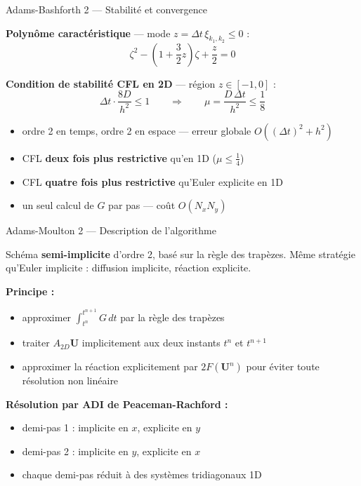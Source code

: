 \documentclass[10pt]{beamer}
\begin{document}
\begin{frame}{Adams-Bashforth 2 — Stabilité et convergence}

\textbf{Polynôme caractéristique} — mode $z = \Delta t\,\xi_{k_1,k_2} \leq 0$ :
\begin{equation}
  \zeta^2 - \left(1 + \frac{3}{2}z\right)\zeta + \frac{z}{2} = 0
\end{equation}

\bigskip

\textbf{Condition de stabilité CFL en 2D} — région $z \in [-1, 0]$ :
\begin{equation}
  \Delta t \cdot \frac{8D}{h^2} \leq 1
  \qquad \Longrightarrow \qquad
  \boxed{\mu = \frac{D\,\Delta t}{h^2} \leq \frac{1}{8}}
\end{equation}

\bigskip

\begin{itemize}
  \item ordre 2 en temps, ordre 2 en espace — erreur globale $O((\Delta t)^2 + h^2)$
  \item CFL \textbf{deux fois plus restrictive} qu'en 1D ($\mu \leq \tfrac{1}{4}$)
  \item CFL \textbf{quatre fois plus restrictive} qu'Euler explicite en 1D
  \item un seul calcul de $G$ par pas — coût $O(N_x N_y)$
\end{itemize}

\end{frame}

\begin{frame}{Adams-Moulton 2 — Description de l'algorithme}

Schéma \textbf{semi-implicite} d'ordre 2, basé sur la règle des trapèzes.
Même stratégie qu'Euler implicite : diffusion implicite, réaction explicite.

\bigskip

\textbf{Principe :}
\begin{itemize}
  \item approximer $\int_{t^n}^{t^{n+1}} G\,dt$ par la règle des trapèzes
  \item traiter $A_{2D}\mathbf{U}$ implicitement aux deux instants $t^n$ et $t^{n+1}$
  \item approximer la réaction explicitement par $2F(\mathbf{U}^n)$
        pour éviter toute résolution non linéaire
\end{itemize}

\bigskip

\textbf{Résolution par ADI de Peaceman-Rachford :}
\begin{itemize}
  \item demi-pas 1 : implicite en $x$, explicite en $y$
  \item demi-pas 2 : implicite en $y$, explicite en $x$
  \item chaque demi-pas réduit à des systèmes tridiagonaux 1D
\end{itemize}

\end{frame}
\end{document}
